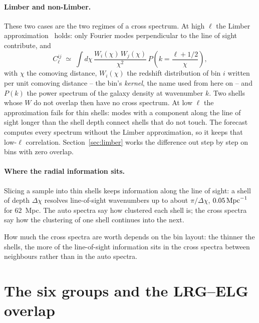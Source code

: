 \documentclass[11pt]{article}
\begin{document}
\paragraph{Limber and non-Limber.}
These two cases are the two regimes of a cross spectrum.  At high
$\ell$ the Limber approximation~\cite{Limber1953} holds: only Fourier
modes perpendicular to the line of sight contribute, and
\begin{equation}
  C^{ij}_\ell \;\simeq\; \int d\chi\, \frac{W_i(\chi)\,W_j(\chi)}{\chi^2}\,
  P\!\left(k = \frac{\ell + 1/2}{\chi}\right) ,
  \label{eq:limber}
\end{equation}
with $\chi$ the comoving distance, $W_i(\chi)$ the redshift
distribution of bin $i$ written per unit comoving distance -- the
bin's \emph{kernel}, the name used from here on -- and $P(k)$
the power spectrum of the galaxy density at wavenumber $k$.  Two shells
whose $W$ do not overlap then have no cross spectrum.  At low $\ell$
the approximation fails for thin shells: modes with a component along
the line of sight longer than the shell depth connect shells that do
not touch.  The forecast computes every spectrum without the Limber
approximation, so it keeps that low-$\ell$ correlation.
Section~\ref{sec:limber} works the difference out step by step on
bins with zero overlap.

\paragraph{Where the radial information sits.}
Slicing a sample into thin shells keeps information along the line of
sight: a shell of depth $\Delta\chi$ resolves line-of-sight wavenumbers
up to about $\pi/\Delta\chi$, $0.05\,{\rm Mpc}^{-1}$ for $62$~Mpc.  The
auto spectra say how clustered each shell is; the cross spectra say how
the clustering of one shell continues into the next.

How much the cross spectra are worth depends on the bin layout:
the thinner the shells, the more of the line-of-sight information
sits in the cross spectra between neighbours rather than in the
auto spectra.

\section{The six groups and the LRG--ELG overlap}
\label{sec:groups}
\end{document}
